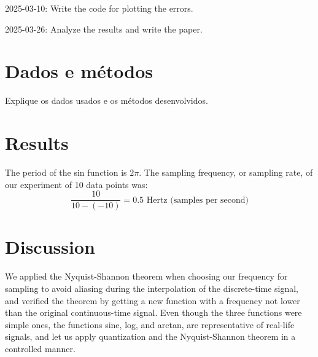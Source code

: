 \documentclass{article}
\begin{document}
2025-03-10: Write the code for plotting the errors.  

2025-03-26: Analyze the results and write the paper.  

\section{Dados e métodos}

Explique os dados usados e os métodos desenvolvidos.

\section{Results}

The period of the sin function is $2\pi$. The sampling frequency, or sampling rate, of our experiment of 10 data points was:  
$$\displaystyle\frac{10}{10-(-10)} = 0.5 \text{ Hertz (samples per second)}$$

\section{Discussion}

We applied the Nyquist-Shannon theorem when choosing our frequency for sampling to avoid aliasing during the interpolation of the discrete-time signal, and verified the theorem by getting a new function with a frequency not lower than the original continuous-time signal. 
Even though the three functions were simple ones, the functions sine, log, and arctan, are representative of real-life signals, and let us apply quantization and the Nyquist-Shannon theorem in a controlled manner.  
\end{document}
